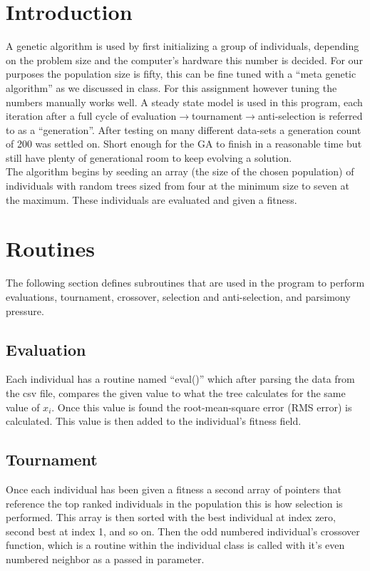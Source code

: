 \documentclass[twoside]{article}
\begin{document}
\begin{multicols}{2}
\section{Introduction}
A genetic algorithm is used by first initializing a group of individuals, depending on the problem size and the computer's hardware this number is decided. For our purposes the population size is fifty, this can be fine tuned with a ``meta genetic algorithm'' as we discussed in class. For this assignment however tuning the numbers manually works well. A steady state model is used in this program, each iteration after a full cycle of evaluation$\rightarrow$tournament$\rightarrow$anti-selection is referred to as a ``generation''. After testing on many different data-sets a generation count of 200 was settled on. Short enough for the GA to finish in a reasonable time but still have plenty of generational room to keep evolving a solution.\\
The algorithm begins by seeding an array (the size of the chosen population) of individuals with random trees sized from four at the minimum size to seven at the maximum. These individuals are evaluated and given a fitness.

\section{Routines}
The following section defines subroutines that are used in the program to perform evaluations, tournament, crossover, selection and anti-selection, and parsimony pressure.

\subsection{Evaluation}
Each individual has a routine named ``eval()'' which after parsing the data from the csv file, compares the given value to what the tree calculates for the same value of $x_i$. Once this value is found the root-mean-square error (RMS error) is calculated. This value is then added to the individual's fitness field.

\subsection{Tournament}
Once each individual has been given a fitness a second array of pointers that reference the top ranked individuals in the population this is how selection is performed. This array is then sorted with the best individual at index zero, second best at index 1, and so on. Then the odd numbered individual's crossover function, which is a routine within the individual class is called with it's even numbered neighbor as a passed in parameter.


\end{multicols}
\end{document}
